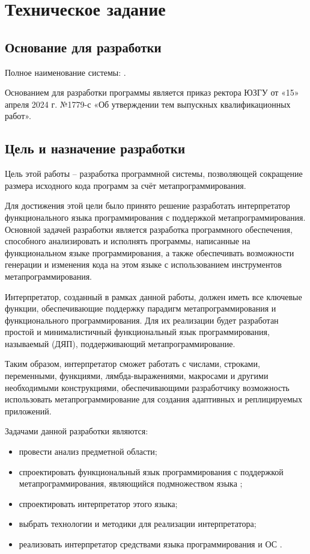 \section{Техническое задание}
\subsection{Основание для разработки}

Полное наименование системы: .

Основанием для разработки программы является приказ ректора ЮЗГУ от «15» апреля 2024 г. №1779-с «Об утверждении тем выпускных квалификационных работ».

\subsection{Цель и назначение разработки}

Цель этой работы -- разработка программной системы, позволяющей сокращение размера исходного кода программ за счёт метапрограммирования.

Для достижения этой цели было принято решение разработать интерпретатор функционального языка программирования с поддержкой метапрограммирования. Основной задачей разработки является разработка программного обеспечения, способного анализировать и исполнять программы, написанные на функциональном языке программирования, а также обеспечивать возможности генерации и изменения кода на этом языке с использованием инструментов метапрограммирования.

Интерпретатор, созданный в рамках данной работы, должен иметь все ключевые функции, обеспечивающие поддержку парадигм метапрограммирования и функционального программирования. Для их реализации будет разработан простой и минималистичный функциональный язык программирования, называемый  (ДЯП), поддерживающий метапрограммирование.

Таким образом, интерпретатор сможет работать с  числами, строками, переменными, функциями, лямбда-выражениями, макросами и другими необходимыми конструкциями, обеспечивающими разработчику возможность использовать метапрограммирование для создания адаптивных и реплицируемых приложений.

Задачами данной разработки являются:
\begin{itemize}
	\item провести анализ предметной области;
	\item спроектировать функциональный язык программирования с поддержкой метапрограммирования, являющийся подмножеством языка ;
	\item спроектировать интерпретатор этого языка;
	\item выбрать технологии и методики для реализации интерпретатора;
	\item реализовать интерпретатор средствами языка программирования  и ОС .
\end{itemize}


